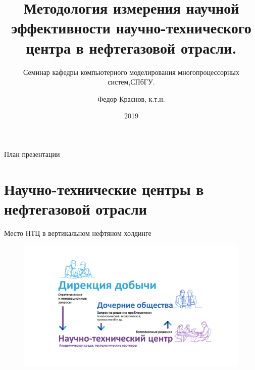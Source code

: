 \documentclass{beamer}
\title[Эффективность НТЦ]{Методология измерения научной эффективности научно-технического центра в нефтегазовой отрасли.	}
\subtitle{Семинар кафедры компьютерного моделирования многопроцессорных систем,СПбГУ.} %
\author{Федор Краснов, к.т.н.}
\institute{Газпромнефть НТЦ}
\date{2019}
\begin{document}
\begin{frame}
  \titlepage
\end{frame}

\begin{frame}{План презентации}
  \tableofcontents
\end{frame}

\section{Научно-технические центры в нефтегазовой отрасли}
\begin{frame}{Место НТЦ в вертикальном нефтяном холдинге}
	\begin{figure}
		\includegraphics[width=\textwidth]{media/end2end.png}
	\end{figure}
	
\end{frame}


\end{document}
